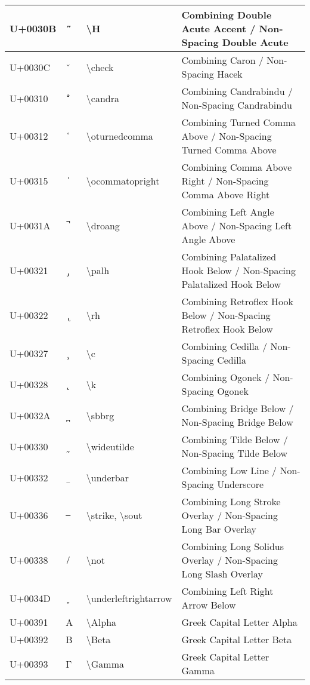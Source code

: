 \begin{table}[h]
\begin{tabulary}{\linewidth}{|L|L|L|L|}
\hline
U+0030B &  ̋  & {\textbackslash}H & Combining Double Acute Accent / Non-Spacing Double Acute \\
\hline
U+0030C &  ̌  & {\textbackslash}check & Combining Caron / Non-Spacing Hacek \\
\hline
U+00310 &  ̐  & {\textbackslash}candra & Combining Candrabindu / Non-Spacing Candrabindu \\
\hline
U+00312 &  ̒  & {\textbackslash}oturnedcomma & Combining Turned Comma Above / Non-Spacing Turned Comma Above \\
\hline
U+00315 &  ̕  & {\textbackslash}ocommatopright & Combining Comma Above Right / Non-Spacing Comma Above Right \\
\hline
U+0031A &  ̚  & {\textbackslash}droang & Combining Left Angle Above / Non-Spacing Left Angle Above \\
\hline
U+00321 &  ̡  & {\textbackslash}palh & Combining Palatalized Hook Below / Non-Spacing Palatalized Hook Below \\
\hline
U+00322 &  ̢  & {\textbackslash}rh & Combining Retroflex Hook Below / Non-Spacing Retroflex Hook Below \\
\hline
U+00327 &  ̧  & {\textbackslash}c & Combining Cedilla / Non-Spacing Cedilla \\
\hline
U+00328 &  ̨  & {\textbackslash}k & Combining Ogonek / Non-Spacing Ogonek \\
\hline
U+0032A &  ̪  & {\textbackslash}sbbrg & Combining Bridge Below / Non-Spacing Bridge Below \\
\hline
U+00330 &  ̰  & {\textbackslash}wideutilde & Combining Tilde Below / Non-Spacing Tilde Below \\
\hline
U+00332 &  ̲  & {\textbackslash}underbar & Combining Low Line / Non-Spacing Underscore \\
\hline
U+00336 &  ̶  & {\textbackslash}strike, {\textbackslash}sout & Combining Long Stroke Overlay / Non-Spacing Long Bar Overlay \\
\hline
U+00338 &  ̸  & {\textbackslash}not & Combining Long Solidus Overlay / Non-Spacing Long Slash Overlay \\
\hline
U+0034D &  ͍  & {\textbackslash}underleftrightarrow & Combining Left Right Arrow Below \\
\hline
U+00391 & Α & {\textbackslash}Alpha & Greek Capital Letter Alpha \\
\hline
U+00392 & Β & {\textbackslash}Beta & Greek Capital Letter Beta \\
\hline
U+00393 & Γ & {\textbackslash}Gamma & Greek Capital Letter Gamma \\

\end{tabulary}
\end{table}
